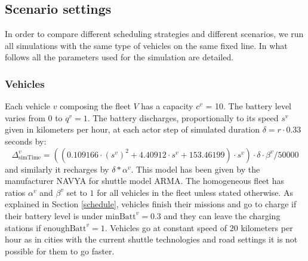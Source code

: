\documentclass[12pt,a4paper]{article}
\begin{document}
\begin{table}
\caption{Simulation framework parameters used.}
\label{table:simparametersused}
\end{table}

\subsection{Scenario settings}\label{scenariosettings}
In order to compare different scheduling strategies and different scenarios, we run all simulations with the same type of vehicles on the same fixed line. In what follows all the parameters used for the simulation are detailed.
\subsubsection{Vehicles}\label{vparam}
Each vehicle $v$ composing the fleet $V$ has a capacity $c^{v}$ = 10. The battery level varies from 0 to $q^{v} = 1$. The battery discharges, proportionally to its speed $s^{v}$ given in kilometers per hour, at each actor step of simulated duration $\delta = r \cdot 0.33$ seconds by:
\begin{equation} \label{vehicleequation}
\Delta_{\text{simTime}}^{v} = ((0.109166\cdot (s^{v})^{2} + 4.40912 \cdot s^{v} + 153.46199) \cdot s^{v}) \cdot \delta \cdot \beta^{v} / 50000
\end{equation}
and similarly it recharges by $ \delta * \alpha^{v}$. This model has been given by the manufacturer NAVYA for shuttle model ARMA. 
The homogeneous fleet has ratios $\alpha^{v}$ and $\beta^{v}$ set to $1$ for all vehicles in the fleet unless stated otherwise. As explained in Section \ref{schedule}, vehicles finish their missions and go to charge if their battery level is under $\text{minBatt}^{v} = 0.3$ and they can leave the charging stations if $\text{enoughBatt}^{v}= 1$. Vehicles go at constant speed of 20 kilometers per hour as in cities with the current shuttle technologies and road settings it is not possible for them to go faster. 
\end{document}
